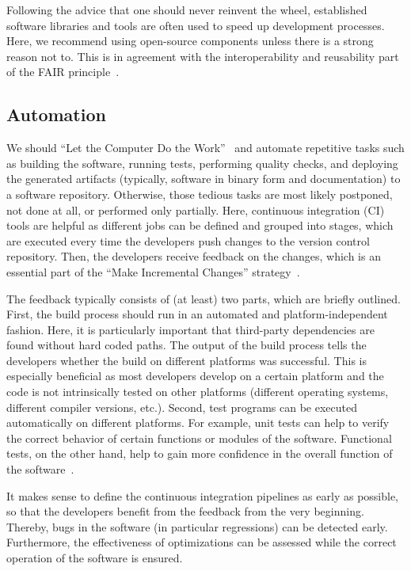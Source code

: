 \documentclass[@CLASSOPTIONS@]{tumarticle}
\begin{document}
Following the advice that one should never reinvent the wheel, established
software libraries and tools are often used to speed up development
processes. Here, we recommend using open-source components unless there is a
strong reason not to. This is in agreement with the interoperability and
reusability part of the FAIR principle~\cite{wilkinson2016, lamprecht2019}.

\subsection{Automation}
\label{sec:automation}

We should
``Let the Computer Do the Work''~\cite{hunt1999pragmatic, wilson2014} and
automate repetitive tasks such as building the software, running tests,
performing quality checks, and deploying the generated artifacts (typically,
software in binary form and documentation) to a software repository.
Otherwise, those tedious tasks are most likely postponed, not done at all,
or performed only partially. Here, continuous integration (CI) tools are
helpful as different jobs can be defined and grouped into stages, which are
executed every time the developers push changes to the version control
repository. Then, the developers receive feedback on the changes, which is an
essential part of the ``Make Incremental Changes'' strategy~\cite{wilson2014}.

The feedback typically consists of (at least) two parts, which are briefly
outlined. First, the build process should run in an automated and
platform-independent fashion. Here, it is particularly important that
third-party dependencies are found without hard coded paths. The output of
the build process tells the developers whether the build on different
platforms was successful. This is especially beneficial as most developers
develop on a certain platform and the code is not intrinsically tested on
other platforms (different operating systems, different compiler versions,
etc.). Second, test programs can be executed automatically on different
platforms. For example, unit tests can help to verify the correct behavior
of certain functions or modules of the software. Functional tests, on the
other hand, help to gain more confidence in the overall function of the
software~\cite{schlauch2018dlrguide}.

It makes sense to define the continuous integration pipelines as early as
possible, so that the developers benefit from the feedback from the very
beginning. Thereby, bugs in the software (in particular regressions) can be
detected early. Furthermore, the effectiveness of optimizations can be
assessed while the correct operation of the software is ensured.
\end{document}
